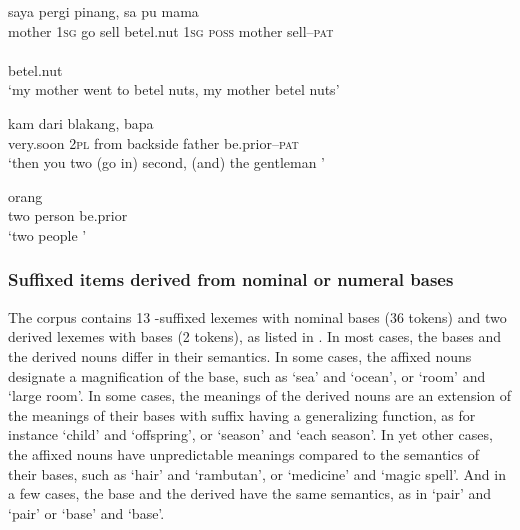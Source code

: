 \ea
\label{Example_3.13}
 {saya} {pergi} {} {pinang,} {sa} {pu} {mama} {}\\ %
 mother  \textsc{1sg}  go  sell  betel.nut  \textsc{1sg}  \textsc{poss}  mother  sell–\textsc{pat}\\
\\
 {betel.nut}\\
\glt 
‘my mother went to  betel nuts, my mother  betel nuts’ \textstyleExampleSource{[081014-014-NP.0002]}
\z

\ea
\label{Example_3.14}
 {kam} {dari} {blakang,} {bapa} {}\\ %
 very.soon  \textsc{2pl}  from  backside  father  be.prior–\textsc{pat}\\

 ‘then you two (go in) second, (and) the gentleman ’ \textstyleExampleSource{[081011-001-Cv.0199]}

\z
\ea
\label{Example_3.15}
 {orang} {}\\ %
 two  person  be.prior\\
 ‘two people ’ \textstyleExampleSource{[080919-001-Cv.0065]}
\z

\subsubsection[Suffixed items derived from nominal or {numeral} bases]{Suffixed items derived from nominal or {numeral} bases}\label{Para_3.1.3.2}
The corpus contains 13 -suffixed lexemes with nominal bases (36 tokens) and two derived lexemes with  bases (2 tokens), as listed in . In most cases, the bases and the derived nouns differ in their semantics. In some cases, the affixed nouns designate a magnification of the base, such as  ‘sea’ and  ‘ocean’, or  ‘room’ and  ‘large room’. In some cases, the meanings of the derived nouns are an extension of the meanings of their bases with suffix  having a generalizing function, as for instance  ‘child’ and  ‘offspring’, or  ‘season’ and  ‘each season’. In yet other cases, the affixed nouns have unpredictable meanings compared to the semantics of their bases, such as  ‘hair’ and  ‘rambutan’, or  ‘medicine’ and  ‘magic spell’. And in a few cases, the base and the derived  have the same semantics, as in  ‘pair’ and  ‘pair’ or  ‘base’ and  ‘base’.



